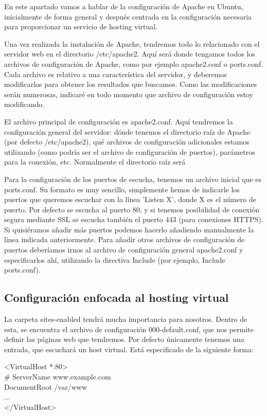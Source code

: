 \documentclass[a4paper, 10pt]{article} %
\begin{document}
En este apartado vamos a hablar de la configuración de Apache en Ubuntu, inicialmente de forma general y después centrada en la configuración necesaria para proporcionar un servicio de hosting virtual. 

Una vez realizada la instalación de Apache, tendremos todo lo relacionado con el servidor web en el directorio /etc/apache2. Aquí será donde tengamos todos los archivos de configuración de Apache, como por ejemplo apache2.conf o ports.conf. Cada archivo es relativo a una característica del servidor, y deberemos modificarlos para obtener los resultados que buscamos. Como las modificaciones serán numerosas, indicaré en todo momento que archivo de configuración estoy modificando. 

El archivo principal de configuración es apache2.conf. Aquí tendremos la configuración general del servidor: dónde tenemos el directorio raíz de Apache (por defecto /etc/apache2), qué archivos de configuración adicionales estamos utilizando (como podría ser el archivo de configuración de puertos), parámetros para la conexión, etc. Normalmente el directorio raíz será 

Para la configuración de los puertos de escucha, tenemos un archivo inicial que es ports.conf. Su formato es muy sencillo, simplemente hemos de indicarle los puertos que queremos escuchar con la línea 'Listen X', donde X es el número de puerto. Por defecto se escucha al puerto 80, y si tenemos posibilidad de conexión segura mediante SSL se escucha también el puerto 443 (para conexiones HTTPS). Si quisiéramos añadir más puertos podemos hacerlo añadiendo manualmente la línea indicada anteriormente. Para añadir otros archivos de configuración de puertos deberíamos irnos al archivo de configuración general apache2.conf y especificarlos ahí, utilizando la directiva Include (por ejemplo, Include ports.conf).

\subsection{Configuración enfocada al hosting virtual}

La carpeta sites-enabled tendrá mucha importancia para nosotros. Dentro de esta, se encuentra el archivo de configuración 000-default.conf, que nos permite definir las páginas web que tendremos. Por defecto únicamente tenemos una entrada, que escuchará un host virtual. Está especificado de la siguiente forma: 

<VirtualHost *:80> \\
	\# ServerName www.example.com\\
	DocumentRoot /var/www \\
	...\\
</VirtualHost>\\
\end{document}
